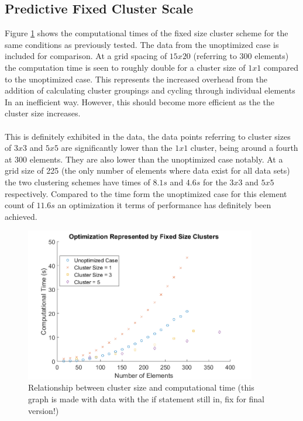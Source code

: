 \subsection{Predictive Fixed Cluster Scale}
Figure \ref{fig:FixedClusterTimes} shows the computational times of the fixed size cluster scheme for the same conditions as previously tested. The data from the unoptimized case is included for comparison. At a grid spacing of $15x20$ (referring to 300 elements) the computation time is seen to roughly double for a cluster size of $1x1$ compared to the unoptimized case. This represents the increased overhead from the addition of calculating cluster groupings and cycling through individual elements In an inefficient way. However, this should become more efficient as the the cluster size increases. 
\\\\
This is definitely exhibited in the data, the data points referring to cluster sizes of $3x3$ and $5x5$ are significantly lower than the $1x1$ cluster, being around a fourth at 300 elements. They are also lower than the unoptimized case notably. At a grid size of 225 (the only number of elements where data exist for all data sets) the two clustering schemes have times of $8.1s$ and $4.6s$ for the $3x3$ and $5x5$ respectively. Compared to the time form the unoptimized case for this element count of $11.6s$ an optimization it terms of performance has definitely been achieved.

\begin{figure}[H]
\centering
\includegraphics[width=0.9\textwidth]{Figures/FixedClusterSizeTimes.png}
\caption{\label{fig:FixedClusterTimes} Relationship between cluster size and computational time (this graph is made with data with the if statement still in, fix for final version!)}
\end{figure} 

